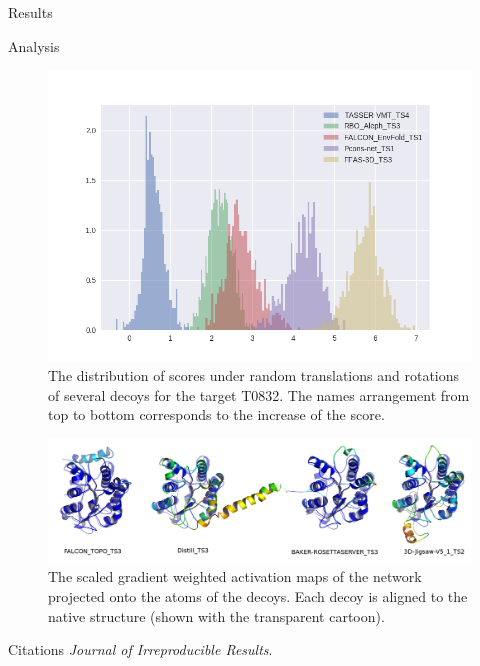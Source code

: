 \documentclass[final, unknownkeysallowed]{beamer}
\begin{document}
\begin{frame}{}
\begin{textblock}{39.0}
\begin{block}{Results}
\end{block}

\begin{block}{Analysis}
\begin{figure}[H]
    \centering
    \includegraphics[width=\linewidth]{../draft/Fig/decoys_sampling_dist.png}
    \caption{The distribution of scores under random translations and rotations of several decoys for the target T0832. The 
    names arrangement from top to bottom corresponds to the increase of the score.}
    \label{Fig:DecoysScoreDistribution}
\end{figure}
\begin{figure}[H]
    \centering
    \includegraphics[width=\linewidth]{../draft/Fig/T0776.png}
    \caption{The scaled gradient weighted activation maps of the network projected onto the atoms of the decoys. 
    Each decoy is aligned to the native structure (shown with the transparent cartoon).}
    \label{Fig:GradCAMT0776_more}
\end{figure}
\end{block}


\begin{block}{Citations}
\emph{Journal of Irreproducible Results}.
\end{block}

\end{textblock}

\end{frame}
\end{document}

